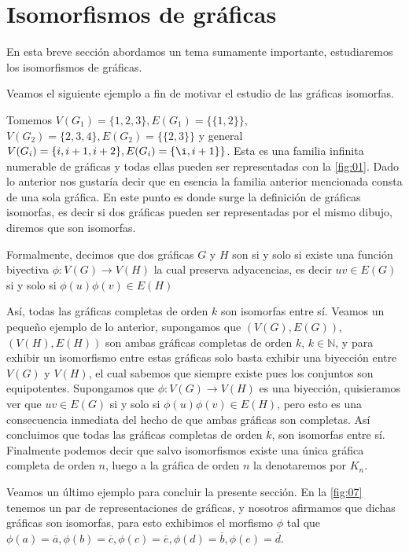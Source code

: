 \section{Isomorfismos de gráficas}
\label{sec:Isomorfismos}
En esta breve sección abordamos un tema sumamente importante, estudiaremos los isomorfismos de gráficas. 


Veamos el siguiente ejemplo a fin de motivar el estudio de las gráficas isomorfas.

Tomemos $V(G_1)=\{ 1,2,3\}, E(G_1)=\{ \{1,2\} \}$, $V(G_2)=\{2,3,4 \}, E(G_2)=\{ \{2,3\} \}$ y general $V(G_i)=\{ i, i+1,i+2\}, E(G_i)=\{ \i,i+1\} \}$.
Esta es una familia infinita numerable de gráficas y todas ellas pueden ser representadas con la \cref{fig:01}.
Dado lo anterior nos gustaría decir que en esencia la familia anterior mencionada consta de una sola gráfica.  En este punto es donde surge la definición de gráficas isomorfas, es decir si dos gráficas pueden ser representadas por el mismo dibujo, diremos que son isomorfas. 

Formalmente, decimos que dos gráficas $G$ y $H$ son  si y solo si existe una función biyectiva $\phi \colon V(G) \to V(H)$ la cual preserva adyacencias, es decir $uv\in E(G)$ si y solo si $\phi(u)\phi(v)\in E(H) $

Así, todas las gráficas completas de orden $k$ son isomorfas entre sí.
Veamos un pequeño ejemplo de lo anterior, supongamos que $(V(G),E(G))$, $(V(H),E(H))$ son ambas gráficas completas de orden $k$, $k\in \mathbb{N}$, y para exhibir un isomorfismo entre estas gráficas solo basta exhibir una biyección entre $V(G)$ y $V(H)$, el cual sabemos que siempre existe pues los conjuntos son equipotentes.
Supongamos que $\phi: V(G) \longrightarrow V(H)$ es una biyección, quisieramos ver que $uv\in E(G)$ si y solo si $\phi(u)\phi(v)\in E(H)$, pero esto es una consecuencia inmediata del hecho de que ambas gráficas son completas.
Así concluimos que todas las gráficas completas de orden $k$, son isomorfas entre sí. Finalmente podemos decir que salvo isomorfismos existe una única gráfica completa de orden $n$, luego a la gráfica de orden $n$ la denotaremos por $K_n$.

Veamos un último ejemplo para concluir la presente sección.
En la \cref{fig:07} tenemos un par de representaciones de gráficas, y nosotros afirmamos que dichas gráficas son isomorfas, para esto exhibimos el morfismo $\phi$ tal que 
$\phi(a)=\overline{a}, \phi(b)=\overline{c}, \phi(c)=\overline{e}, \phi(d)=\overline{b}, \phi(e)=\overline{d} $.

